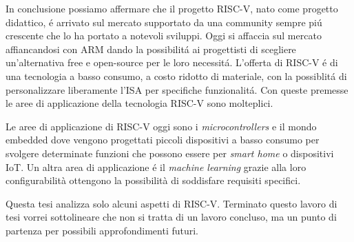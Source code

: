 \documentclass[12pt, a4paper]{report}
\begin{document}
In conclusione possiamo affermare che il progetto RISC-V, nato come progetto didattico, \'e arrivato sul mercato supportato da una community sempre pi\'u crescente che lo ha portato a notevoli sviluppi. Oggi si affaccia sul mercato affiancandosi con ARM dando la possibilit\'a ai progettisti di scegliere un'alternativa free e open-source per le loro necessit\'a. L'offerta di RISC-V \'e di una tecnologia a basso consumo, a costo ridotto di materiale, con la possiblit\'a di personalizzare liberamente l'ISA per specifiche funzionalit\'a. Con queste premesse le aree di applicazione della tecnologia RISC-V sono molteplici. 


Le aree di applicazione di RISC-V oggi sono i \textit{microcontrollers} e il mondo embedded dove vengono progettati piccoli dispositivi a basso consumo per svolgere determinate funzioni che possono essere per \textit{smart home} o dispositivi IoT.
Un altra area di applicazione \'e il \textit{machine learning} grazie alla loro configurabilità ottengono la possibilità di soddisfare requisiti specifici.


Questa tesi analizza solo alcuni aspetti di RISC-V. 
Terminato questo lavoro di tesi vorrei sottolineare che non si tratta di un lavoro concluso, ma un punto di partenza per possibili approfondimenti futuri. 




\printbibliography 
\end{document}
